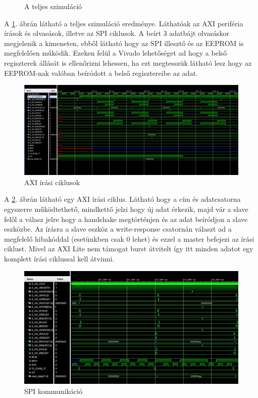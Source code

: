 \documentclass[a4paper,11pt]{article}
\begin{document}
\begin{figure}[H]
\begin{center}
	\caption{A teljes szimuláció}
	\label{fig:sim_complete}
	\end{center}
\end{figure}

A \ref{fig:sim_complete}. ábrán látható a teljes szimuláció eredménye. Láthatóak az AXI periféria írások és olvasások, illetve az SPI ciklusok. A beírt 3 adatbájt olvasáskor megjelenik a kimeneten, ebből látható hogy az SPI illesztő és az EEPROM is megfelelően működik. Ezeken felül a Vivado lehetőséget ad hogy a belső regiszterek állását is ellenőrizni lehessen, ha ezt megtesszük látható lesz hogy az EEPROM-nak valóban beíródott a belső regisztereibe az adat.

\begin{figure}[H]
	\begin{center}
	\includegraphics[scale=0.5]{axi_write.JPG}
	\caption{AXI írási ciklusok}	
	\label{fig:axi_write}
	\end{center}
\end{figure}

A \ref{fig:axi_write}. ábrán látható egy AXI írási ciklus. Látható hogy a cím és adatcsatorna egyszerre működtethető, mindkettő jelzi hogy új adat érkezik, majd vár a slave felől a válasz jelre hogy a handshake megtörténjen és az adat beíródjon a slave eszközbe. Az írásra a slave eszköz a write-response csatornán választ ad a megfelelő hibakóddal (esetünkben csak 0 lehet) és ezzel a master befejezi az írási ciklust. Mivel az AXI Lite nem támogat burst átvitelt így itt minden adatot egy komplett írási ciklussal kell átvinni.

\begin{figure}[H]
	\begin{center}
	\includegraphics[scale=0.7]{SPI.JPG}	
	\end{center}
	\caption{SPI kommunikáció}
	\label{fig:spisim}
\end{figure}
\end{document}
